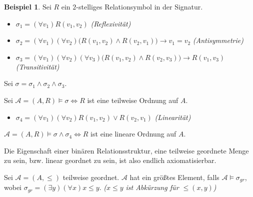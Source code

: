\documentclass{article}
\theoremstyle{definition}
\newtheorem*{exm}{Beispiel}
\newcommand{\calA}{\mathcal{A}}
\begin{document}
    \begin{exm}
        Sei $ R $ ein $ 2 $-stelliges Relationsymbol in der Signatur.
        \begin{itemize}
            \item $ \sigma_1 = (\forall v_1) R(v_1, v_2) $ \hfill \textit{(Reflexivität)}
            \item $ \sigma_2 = (\forall v_1) (\forall v_2) \big(R(v_1, v_2) \land R(v_2, v_1)\big) \rightarrow v_1 = v_2 $ \hfill \textit{(Antisymmetrie)}
            \item $ \sigma_3 = (\forall v_1) (\forall v_2) (\forall v_3) \big(R(v_1, v_2) \land R(v_2, v_3)\big) \rightarrow R(v_1, v_3) $ \hfill \textit{(Transitivität)}
        \end{itemize}

        Sei $ \sigma = \sigma_1 \land \sigma_2 \land \sigma_3 $.

        Sei $ \calA = (A, R) \models \sigma \Leftrightarrow R $  ist eine teilweise Ordnung auf $ A $.

        \begin{itemize}
            \item $ \sigma_4 = (\forall v_1) (\forall v_2) R(v_1, v_2) \lor R(v_2, v_1) $ \hfill \textit{(Linearität)}
        \end{itemize}

        $ \calA = (A, R) \models \sigma \land \sigma_4 \Leftrightarrow R $ ist eine lineare Ordnung auf $ A $.

        Die Eigenschaft einer binären Relationsstruktur, eine teilweise geordnete Menge zu sein, bzw. linear geordnet zu sein, ist also endlich axiomatisierbar.

        Sei $ \calA = (A, \leq) $ teilweise geordnet.
        $ \calA $ hat ein größtes Element, falls $ \calA \models \sigma_{gr} $, wobei $ \sigma_{gr} = (\exists y) (\forall x) x \leq y $. \textit{($ x \leq y $ ist Abkürzung für $ \leq(x, y) $)}
    \end{exm}
\end{document}
